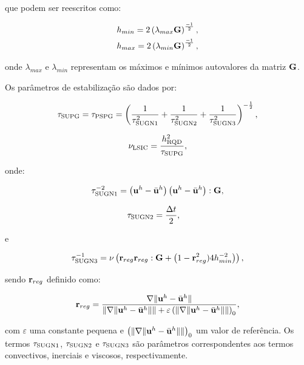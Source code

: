 \documentclass[tese_patricia]{subfiles}%
\begin{document}
\noindent que podem ser reescritos como:

\begin{align}
	h_{min} = 2\left(\lambda_{max}\mathbf{G}\right)^{\frac{-1}{2}}, \\
	h_{max} = 2\left(\lambda_{min}\mathbf{G}\right)^{\frac{-1}{2}},
\end{align}

\noindent onde $\lambda_{max}$ e $\lambda_{min}$ representam os máximos e mínimos autovalores da matriz $\mathbf{G}$. 

Os parâmetros de estabilização são dados por:

\begin{align}
	\tau_{\mathrm{SUPG}} = \tau_{\mathrm{PSPG}} =\left(\frac{1}{\tau_{\mathrm{SUGN1}}^2} + \frac{1}{\tau_{\mathrm{SUGN2}}^2} + \frac{1}{\tau_{\mathrm{SUGN3}}^2} \right)^{-\frac{1}{2}},
\end{align}

\begin{align}
	\nu_{\mathrm{LSIC}} = \frac{h_{\mathrm{RQD}}^2}{\tau_{\mathrm{SUPG}}},
\end{align}

\noindent onde:

\begin{align}
	\tau_{\mathrm{SUGN1}}^{-2} = \left(\mathbf{u}^h - \bar{\mathbf{u}}^h \right) \left(\mathbf{u}^h - \bar{\mathbf{u}}^h \right) : \mathbf{G} ,
\end{align}

\begin{align}
	\tau_{\mathrm{SUGN2}}&=\frac{\Delta t}{2},
\end{align}

\noindent e

\begin{align}
	\tau_{\mathrm{SUGN3}}^{-1} = \nu \left(\mathbf{r}_{reg}\mathbf{r}_{reg} : \mathbf{G} + \left(1 - \mathbf{r}_{reg}^2)4h_{min}^{-2} \right)\right) ,
\end{align}

\noindent sendo $\mathbf{r}_{reg}$ definido como:

\begin{align}
	\mathbf{r}_{reg} =\frac{\nabla \lVert\mathbf{u}^h - \bar{\mathbf{u}}^h\rVert}{\lVert \nabla \lVert\mathbf{u}^h - \bar{\mathbf{u}}^h\rVert\rVert + \varepsilon\left(\lVert \nabla \lVert\mathbf{u}^h - \bar{\mathbf{u}}^h\rVert\rVert\right)_0},
\end{align}

\noindent com $\varepsilon$ uma constante pequena e $\left(\lVert \nabla \lVert\mathbf{u}^h- \bar{\mathbf{u}}^h\rVert\rVert\right)_0$ um valor de referência. Os termos $\tau_{\mathrm{SUGN1}}$, $\tau_{\mathrm{SUGN2}}$ e $\tau_{\mathrm{SUGN3}}$ são parâmetros correspondentes aos termos convectivos, inerciais e viscosos, respectivamente.
\end{document}
